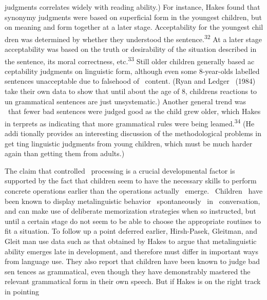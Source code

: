 \clearpage\setcounter{page}{1}\begin{styleStandard}
judgments correlates widely with reading ability.) For instance, Hakes found that synonymy judgments were based on superficial form in the youngest children, but on meaning and form together at a later stage. Acceptability for the youngest chil\- dren was determined by whether they understood the sentence.\textsuperscript{32}\textsuperscript{ }At a later stage acceptability was based on the truth or desirability of the situation described in the sentence, its moral correctness, etc.\textsuperscript{33}\textsuperscript{ }Still older children generally based ac\- ceptability judgments on linguistic form, although even some 8-year-olds labelled sentences unacceptable due to falsehood of \ content. (Ryan and Ledger \ (1984) take their own data to show that until about the age of 8, children{\textquotesingle}s reactions to un\- grammatical sentences are just unsystematic.) Another general trend was \ that fewer bad sentences were judged good as the child grew older, which Hakes in\- terprets as indicating that more grammatical rules were being leamed.\textsuperscript{34 }(He addi\- tionally provides an interesting discussion of the methodological problems in get\- ting linguistic judgments from young children, which must be much harder again than getting them from adults.)
\end{styleStandard}


\begin{styleStandard}
The claim that controlled \ processing is a crucial developmental factor is supported by the fact that children seem to have the necessary skills to perform concrete operations earlier than the operations actually \ emerge. \ Children \ have been known to display metalinguistic behavior \ spontaneously \ in \ conversation, and can make use of deliberate memorization strategies when so instructed, but until a certain stage do not seem to be able to choose the appropriate routines to fit a situation. To follow up a point deferred earlier, Hirsh-Pasek, Gleitman, and Gleit\- man use data such as that obtained by Hakes to argue that metalinguistic ability emerges late in development, and therefore must differ in important ways from language use. They also report that children have been known to judge bad sen\- tences as grammatical, even though they have demonstrably mastered the relevant grammatical form in their own speech. But if Hakes is on the right track in pointing
\end{styleStandard}


